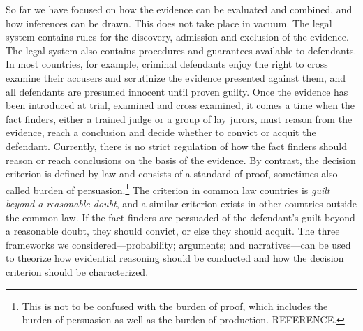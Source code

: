 \documentclass[10pt]{article}
\begin{document}
So far we have focused on how the evidence can be evaluated and combined, and how inferences can be drawn. 
This does not take place in vacuum. 
The legal system contains rules for the discovery, admission and exclusion of the evidence. 
The legal system also contains 
procedures and guarantees available to defendants. In most countries, for example, criminal defendants enjoy 
the right to cross examine their accusers and scrutinize the evidence presented against them, and all defendants are 
presumed innocent until proven guilty. 
Once the evidence has been introduced at trial, examined and cross examined, it comes a time when the fact finders, either a 
trained judge or a group of lay jurors, must reason from the evidence, reach a conclusion and decide 
whether to convict or acquit the defendant. 
Currently, there is no strict regulation of how the fact finders should reason or 
reach conclusions on the basis of the evidence. By contrast, the decision criterion is defined by law 
and consists of a standard of proof, sometimes also called burden of persuasion.\footnote{This is not to be confused with the burden of proof, which includes the burden of persuasion as well as the burden of production. REFERENCE.} 
The criterion in common law countries is 
\textit{guilt beyond a reasonable doubt}, and a similar criterion exists in other countries outside the common law.
 If the fact finders are persuaded of the defendant's guilt beyond a reasonable doubt, 
 they should convict, or else they should acquit.  The three frameworks we considered---probability; arguments; and narratives---can be used to theorize 
 how evidential reasoning should be conducted and how the decision criterion should be characterized. 
\end{document}
